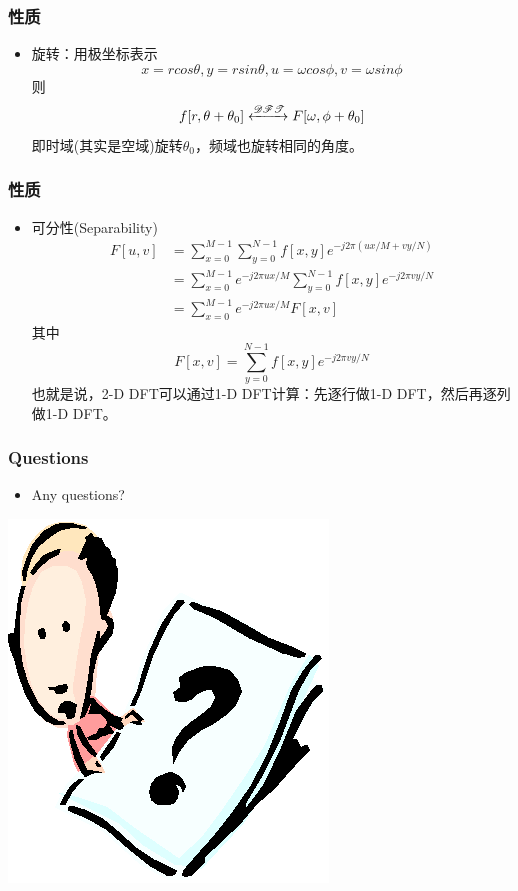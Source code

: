 \documentclass[CJKutf8,xcolor=pdftex,dvipsnames,table]{beamer}
\begin{document}
\begin{CJK*}{UTF8}{song}
  \begin{frame}
    \frametitle{性质}
    \begin{itemize}
    \item 旋转：用极坐标表示    
    \[
    	x=rcos\theta, y=rsin\theta, u = \omega cos\phi, v=\omega sin \phi
    \]
    则
    \[
    	f[r, \theta+\theta_0] \xleftrightarrow{\mathscr{DFT}} F[\omega, \phi+\theta_0]
    \]
    即时域(其实是空域)旋转$\theta_0$，频域也旋转相同的角度。
    \end{itemize}
  \end{frame}  
  
  \begin{frame}
    \frametitle{性质}
    \begin{itemize}
    \item 可分性(Separability)    
    \begin{align*}
    	F[u, v] & = \sum_{x=0}^{M-1} \sum_{y=0}^{N-1} f[x, y] e^{-j2\pi (ux/M+vy/N)} \\
	            & = \sum_{x=0}^{M-1} e^{-j2\pi ux/M} \sum_{y=0}^{N-1} f[x, y] e^{-j2\pi vy/N} \\
	            & = \sum_{x=0}^{M-1} e^{-j2\pi ux/M} F[x, v]
    \end{align*}
    其中
    \[
	    F[x, v] = \sum_{y=0}^{N-1} f[x, y] e^{-j2\pi vy/N}
    \]
    也就是说，2-D DFT可以通过1-D DFT计算：先逐行做1-D DFT，然后再逐列做1-D DFT。    
    \end{itemize}
  \end{frame}  
    
  \begin{frame}
    \frametitle{Questions}
    \begin{itemize}
    \item Any questions?
    \end{itemize}
    \begin{center}
      \includegraphics[scale=.5]{question}
    \end{center}
  \end{frame}  
  
\end{CJK*}
\end{document}
